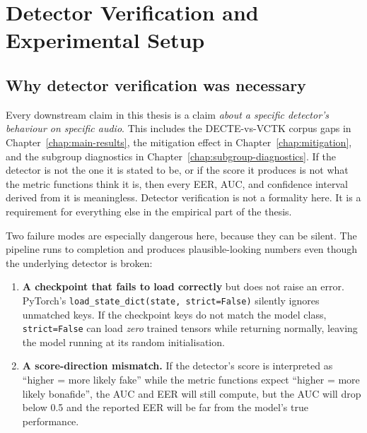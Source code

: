 \cleardoubleoddpage
\chapter{Detector Verification and Experimental Setup}
\label{chap:detector-verification}



\section{Why detector verification was necessary}
\label{sec:detector-verification-overview}

Every downstream claim in this thesis is a claim \emph{about a
specific detector's behaviour on specific audio}. This includes the
DECTE-vs-VCTK corpus gaps in Chapter~\ref{chap:main-results}, the
mitigation effect in Chapter~\ref{chap:mitigation}, and the
subgroup diagnostics in Chapter~\ref{chap:subgroup-diagnostics}. If
the detector is not the one it is stated to be, or if the score it
produces is not what the metric functions think it is, then every
EER, AUC, and confidence interval derived from it is meaningless.
Detector verification is not a formality here. It is a requirement
for everything else in the empirical part of the thesis.

Two failure modes are especially dangerous here, because they can
be silent. The pipeline runs to completion and produces
plausible-looking numbers even though the underlying detector is
broken:

\begin{enumerate}
    \item \textbf{A checkpoint that fails to load correctly} but does not raise
        an error. PyTorch's \texttt{load\_state\_dict(state, strict=False)}
        silently ignores unmatched keys. If the checkpoint keys do not
        match the model class, \texttt{strict=False} can load \emph{zero} trained
        tensors while returning normally, leaving the model running at
        its random initialisation.
    \item \textbf{A score-direction mismatch.} If the detector's score is
        interpreted as ``higher = more likely fake'' while the metric
        functions expect ``higher = more likely bonafide'', the AUC and
        EER will still compute, but the AUC will drop below 0.5 and the
        reported EER will be far from the model's true performance.
\end{enumerate}

